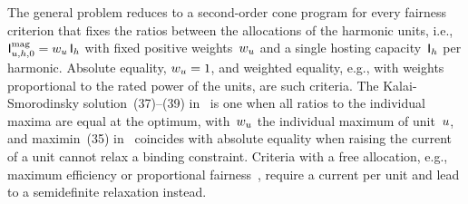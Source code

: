 The general problem reduces to a second-order cone program for every fairness criterion that fixes the ratios between the allocations of the harmonic units, i.e., $\mathsf{I}^{\text{mag}}_{u,h,0} = w_{u}\,\mathsf{I}_{h}$ with fixed positive weights~$w_{u}$ and a single hosting capacity~$\mathsf{I}_{h}$ per harmonic. Absolute equality, $w_{u} = 1$, and weighted equality, e.g., with weights proportional to the rated power of the units, are such criteria. The Kalai-Smorodinsky solution~(37)--(39) in~\cite{vanacker_hosting_2026} is one when all ratios to the individual maxima are equal at the optimum, with~$w_{u}$ the individual maximum of unit~$u$, and maximin~(35) in~\cite{vanacker_hosting_2026} coincides with absolute equality when raising the current of a unit cannot relax a binding constraint. Criteria with a free allocation, e.g., maximum efficiency or proportional fairness~\cite{chen_guide_2023}, require a current per unit and lead to a semidefinite relaxation instead.

